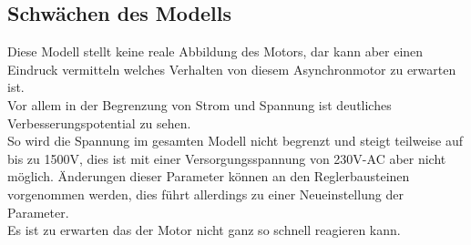 \subsection{Schwächen des Modells}
Diese Modell stellt keine reale Abbildung des Motors, dar kann aber einen Eindruck vermitteln welches Verhalten von diesem Asynchronmotor zu erwarten ist.\\
Vor allem in der Begrenzung von Strom und Spannung ist deutliches Verbesserungspotential zu sehen.\\
So wird die Spannung im gesamten Modell nicht begrenzt und steigt teilweise auf bis zu 1500V, dies ist mit einer Versorgungsspannung von 230V-AC aber nicht möglich. Änderungen dieser Parameter können an den Reglerbausteinen vorgenommen werden, dies führt allerdings zu einer Neueinstellung der Parameter.\\ Es ist zu erwarten das der Motor nicht ganz so schnell reagieren kann.
